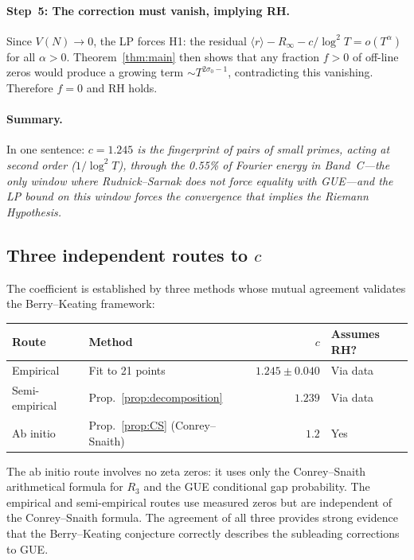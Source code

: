 \documentclass[10pt]{article}
\begin{document}
\paragraph{Step~5: The correction must vanish, implying RH.}
Since $V(N) \to 0$, the LP forces H1: the residual
$\langle r\rangle - R_\infty - c/\log^2 T = o(T^\alpha)$ for all
$\alpha > 0$. Theorem~\ref{thm:main} then shows that any fraction $f > 0$
of off-line zeros would produce a growing term $\sim T^{2\sigma_0-1}$,
contradicting this vanishing. Therefore $f = 0$ and RH holds.

\paragraph{Summary.}
In one sentence: \emph{$c = 1.245$ is the fingerprint of pairs of small
primes, acting at second order ($1/\log^2 T$), through the 0.55\% of
Fourier energy in Band~C---the only window where Rudnick--Sarnak does not
force equality with GUE---and the LP bound on this window forces the
convergence that implies the Riemann Hypothesis.}

\subsection{Three independent routes to $c$}

The coefficient is established by three methods whose mutual agreement
validates the Berry--Keating framework:
\begin{center}
\begin{tabular}{llrl}
\toprule
Route & Method & $c$ & Assumes RH? \\
\midrule
Empirical & Fit to 21 points~\cite{alarcon2026a} & $1.245 \pm 0.040$ & Via data \\
Semi-empirical & Prop.~\ref{prop:decomposition} & $1.239$ & Via data \\
Ab initio & Prop.~\ref{prop:CS} (Conrey--Snaith) & $1.2$ & Yes \\
\bottomrule
\end{tabular}
\end{center}
The ab initio route involves no zeta zeros: it uses only the Conrey--Snaith
arithmetical formula for $R_3$ and the GUE conditional gap probability.
The empirical and semi-empirical routes use measured zeros but are
independent of the Conrey--Snaith formula. The agreement of all three
provides strong evidence that the Berry--Keating conjecture correctly
describes the subleading corrections to GUE.
\end{document}
